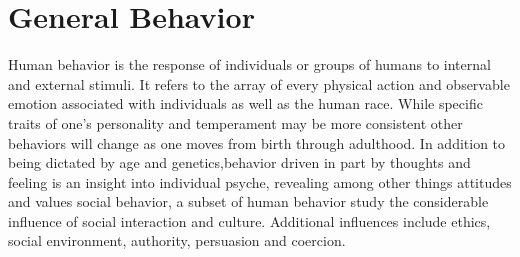 \documentclass[12pt,a4paper]{article}
\renewcommand{\baselinestretch}{1.5}
\begin{document}


\newpage 
\renewcommand{\baselinestretch}{1}\normalsize
\tableofcontents


\newpage

\setcounter{page}{1}

\setcounter{secnumdepth}{3}
\renewcommand{\baselinestretch}{1.5}\normalsize
\section{General Behavior}

Human behavior is the response of individuals or groups of humans to internal and external stimuli. It refers to the array of every physical action and observable emotion associated with individuals as well as the human race.  While specific traits of one’s personality and temperament may be more consistent other behaviors will change as one moves from birth through adulthood. In addition to being dictated by age and genetics,behavior driven in part by thoughts and feeling is an insight into individual psyche, revealing among other things attitudes and values social behavior, a subset of human behavior study the considerable influence of social interaction and culture. Additional influences include ethics, social environment, authority, persuasion and coercion.
 
\end{document}
